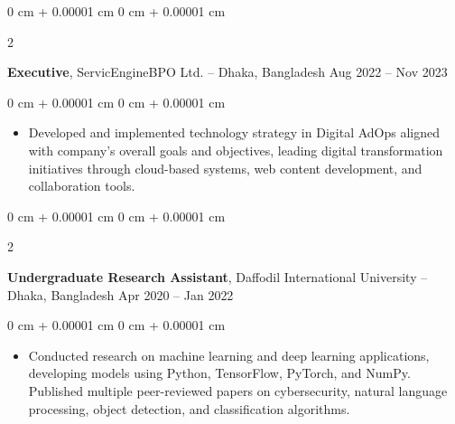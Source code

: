\documentclass[10pt, letterpaper]{article}
\newenvironment{highlights}{
    \begin{itemize}[
        topsep=0.10 cm,
        parsep=0.10 cm,
        partopsep=0pt,
        itemsep=0pt,
        leftmargin=0 cm + 10pt
    ]
}{
    \end{itemize}
} %
\newenvironment{onecolentry}{
    \begin{adjustwidth}{
        0 cm + 0.00001 cm
    }{
        0 cm + 0.00001 cm
    }
}{
    \end{adjustwidth}
} %
\newenvironment{twocolentry}[2][]{
    \onecolentry
    \def\secondColumn{#2}
    \setcolumnwidth{\fill, 4.5 cm}
    \begin{paracol}{2}
}{
    \switchcolumn \raggedleft \secondColumn
    \end{paracol}
    \endonecolentry
} %
\begin{document}
        \vspace{0.2 cm}

        \begin{twocolentry}{
            Aug 2022 – Nov 2023
        }
            \textbf{Executive}, ServicEngineBPO Ltd. -- Dhaka, Bangladesh\end{twocolentry}
        
        \vspace{0.10 cm}
        \begin{onecolentry}
            \begin{highlights}
    \item Developed and implemented technology strategy in Digital AdOps aligned with company's overall goals and objectives, leading digital transformation initiatives through cloud-based systems, web content development, and collaboration tools.
\end{highlights}
        \end{onecolentry}

        \vspace{0.2 cm}

        \begin{twocolentry}{
            Apr 2020 – Jan 2022
        }
            \textbf{Undergraduate Research Assistant}, Daffodil International University -- Dhaka, Bangladesh\end{twocolentry}
        
        \vspace{0.10 cm}
        \begin{onecolentry}
\begin{highlights}
    \item Conducted research on machine learning and deep learning applications, developing models using Python, TensorFlow, PyTorch, and NumPy. Published multiple peer-reviewed papers on cybersecurity, natural language processing, object detection, and classification algorithms.
\end{highlights}
        \end{onecolentry}

    



        
\end{document}
